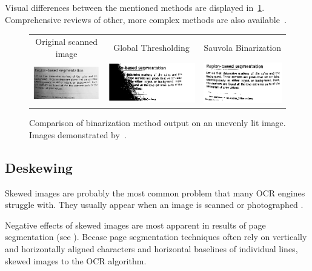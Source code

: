 Visual differences between the mentioned methods are displayed in~\cref{fig:preprocessBinarization}. Comprehensive reviews of other, more complex methods are also available~\citep{localOtherBin}.

\begin{figure}
\centering
{\sffamily
\begin{tabular}{ccc}
Original scanned image &
Global Thresholding &
Sauvola Binarization \\
\includegraphics[width=.3\linewidth]{img/preprocessing/bin_orig.png} &
\includegraphics[width=.3\linewidth]{img/preprocessing/bin_glob.png} &
\includegraphics[width=.3\linewidth]{img/preprocessing/bin_sauvola.png}
\end{tabular}
}
\caption{Comparison of binarization method output on an unevenly lit image. Images demonstrated by~\citet{binarizationComp}.}
\label{fig:preprocessBinarization}
\end{figure}

\subsection{Deskewing} \label{deskewing}

Skewed images are probably the most common problem that many OCR engines struggle with. They usually appear when an image is scanned or photographed .

Negative effects of skewed images are most apparent in results of page segmentation (see ). Becase page segmentation techniques often rely on vertically and horizontally aligned characters and horizontal baselines of individual lines, skewed images  to the OCR algorithm. 

